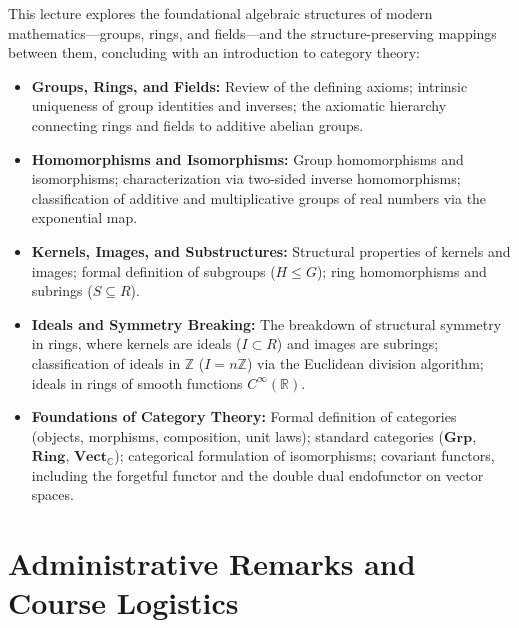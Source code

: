\begin{overview}
This lecture explores the foundational algebraic structures of modern mathematics---groups, rings, and fields---and the structure-preserving mappings between them, concluding with an introduction to category theory:
\begin{itemize}
    \item \textbf{Groups, Rings, and Fields:} Review of the defining axioms; intrinsic uniqueness of group identities and inverses; the axiomatic hierarchy connecting rings and fields to additive abelian groups.
    \item \textbf{Homomorphisms and Isomorphisms:} Group homomorphisms and isomorphisms; characterization via two-sided inverse homomorphisms; classification of additive and multiplicative groups of real numbers via the exponential map.
    \item \textbf{Kernels, Images, and Substructures:} Structural properties of kernels and images; formal definition of subgroups ($H \le G$); ring homomorphisms and subrings ($S \subseteq R$).
    \item \textbf{Ideals and Symmetry Breaking:} The breakdown of structural symmetry in rings, where kernels are ideals ($I \subset R$) and images are subrings; classification of ideals in $\mathbb{Z}$ ($I = n\mathbb{Z}$) via the Euclidean division algorithm; ideals in rings of smooth functions $C^\infty(\mathbb{R})$.
    \item \textbf{Foundations of Category Theory:} Formal definition of categories (objects, morphisms, composition, unit laws); standard categories ($\mathbf{Grp}$, $\mathbf{Ring}$, $\mathbf{Vect}_{\mathbb{C}}$); categorical formulation of isomorphisms; covariant functors, including the forgetful functor and the double dual endofunctor on vector spaces.
\end{itemize}
\end{overview}

\section{Administrative Remarks and Course Logistics}

